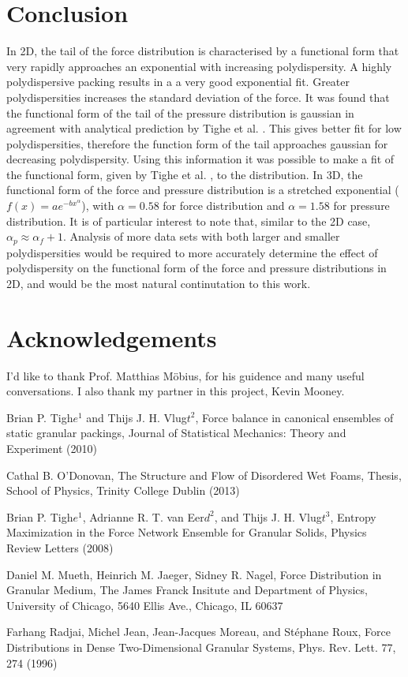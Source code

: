 \documentclass[12pt] {article} %
\begin{document}
\section{Conclusion}
In 2D, the tail of the force distribution is characterised by a functional form that very rapidly approaches an exponential with increasing polydispersity. A highly polydispersive packing results in a a very good exponential fit. Greater polydispersities increases the standard deviation of the force. It was found that the functional form of the tail of the pressure distribution is gaussian in agreement with analytical prediction by Tighe et al. \cite{tighepaper}. This gives better fit for low polydispersities, therefore the function form of the tail approaches gaussian for decreasing polydispersity. Using this information it was possible to make a fit of the functional form, given by Tighe et al. \cite{tighepaper}, to the distribution. In 3D, the functional form of the force and pressure distribution is a stretched exponential ($f(x)=ae^{-bx^\alpha}$), with $\alpha = 0.58$ for force distribution and $\alpha = 1.58$ for pressure distribution. It is of particular interest to note that, similar to the 2D case, $\alpha_p \approx \alpha_f + 1$.
Analysis of more data sets with both larger and smaller polydispersities would be required to more accurately determine the effect of polydispersity on the functional form of the force and pressure distributions in 2D, and would be the most natural continutation to this work. 

\section{Acknowledgements}
I'd like to thank Prof. Matthias M\"{o}bius, for his guidence and many useful conversations. I also thank my partner in this project, Kevin Mooney.  



\begin{thebibliography}{}

 	Brian P. Tigh$e^1$ and Thijs J. H. Vlug$t^2$, Force balance in canonical ensembles of
static granular packings, Journal of Statistical Mechanics: 
Theory and Experiment (2010)

	Cathal B. O'Donovan, The Structure and Flow of
Disordered Wet Foams, Thesis, School of Physics, Trinity College Dublin (2013)

	Brian P. Tigh$e^1$, Adrianne R. T. van Eer$d^2$, and Thijs J. H. Vlug$t^3$, Entropy Maximization in the Force Network Ensemble for Granular Solids, Physics Review Letters (2008)

	 Daniel M. Mueth, Heinrich M. Jaeger, Sidney R. Nagel, Force Distribution in Granular Medium, The James Franck Insitute and Department of Physics, University of Chicago, 5640 Ellis Ave., Chicago, IL 60637

 Farhang Radjai, Michel Jean, Jean-Jacques Moreau, and Stéphane Roux, Force Distributions in Dense Two-Dimensional Granular Systems, Phys. Rev. Lett. 77, 274 (1996)

\end{thebibliography}{}
\end{document}
